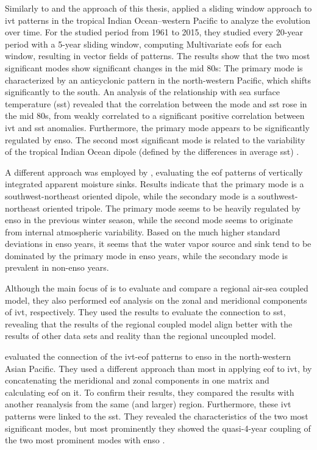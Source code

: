 Similarly to \cite{vietinghoff_visual_2021} and the approach of this thesis, \citeauthor{zou_interdecadal_2018} applied a sliding window approach to \ac{ivt} patterns in the tropical Indian Ocean–western Pacific to analyze the evolution over time. 
For the studied period from 1961 to 2015, they studied every 20-year period with a 5-year sliding window, computing Multivariate \acp{eof} for each window, resulting in vector fields of patterns. 
The results show that the two most significant modes show significant changes in the mid 80s: The primary mode is characterized by an anticyclonic pattern in the north-western Pacific, which shifts significantly to the south. 
An analysis of the relationship with sea surface temperature (\ac{sst}) revealed that the correlation between the mode and \ac{sst} rose in the mid 80s, from weakly correlated to a significant positive correlation between \ac{ivt} and \ac{sst} anomalies. 
Furthermore, the primary mode appears to be significantly regulated by \ac{enso}. 
The second most significant mode is related to the variability of the tropical Indian Ocean dipole (defined by the differences in average \ac{sst}) \cite{zou_interdecadal_2018}.

A different approach was employed by \cite{zou_investigating_2020}, evaluating the \ac{eof} patterns of vertically integrated apparent moisture sinks. 
Results indicate that the primary mode is a southwest-northeast oriented dipole, while the secondary mode is a southwest-northeast oriented tripole. 
The primary mode seems to be heavily regulated by \ac{enso} in the previous winter season, while the second mode seems to originate from internal atmospheric variability. 
Based on the much higher standard deviations in \ac{enso} years, it seems that the water vapor source and sink tend to be dominated by the primary mode in \ac{enso} years, while the secondary mode is prevalent in non-\ac{enso} years. 


Although the main focus of \cite{yao_simulation_2013} is to evaluate and compare a regional air-sea coupled model, they also performed \ac{eof} analysis on the zonal and meridional components of \ac{ivt}, respectively. 
They used the results to evaluate the connection to \ac{sst}, revealing that the results of the regional coupled model align better with the results of other data sets and reality than the regional uncoupled model. 


\citeauthor{li_quasi-4-yr_2012} evaluated the connection of the \ac{ivt}-\ac{eof} patterns to \ac{enso} in the north-western Asian Pacific.
They used a different approach than most in applying \ac{eof} to \ac{ivt}, by concatenating the meridional and zonal components in one matrix and calculating \ac{eof} on it. 
To confirm their results, they compared the results with another reanalysis from the same (and larger) region. 
Furthermore, these \ac{ivt} patterns were linked to the \ac{sst}. 
They revealed the characteristics of the two most significant modes, but most prominently they showed the quasi-4-year coupling of the two most prominent modes with \ac{enso} \cite{li_quasi-4-yr_2012}. 



